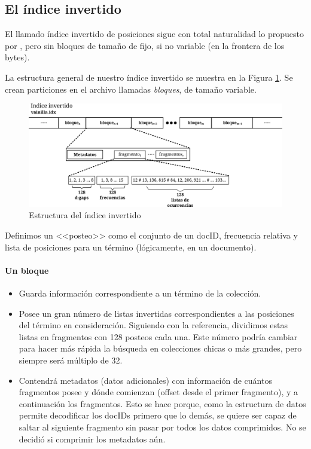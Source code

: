 \subsection{El índice invertido}

El llamado índice invertido de posiciones sigue con total naturalidad lo propuesto por \cite{Zhang:2008}, pero sin bloques de tamaño de fijo, si no variable (en la frontera de los bytes).

La estructura general de nuestro índice invertido se muestra en la Figura \ref{fig:indice}. Se crean particiones en el archivo llamadas \textit{bloques}, de tamaño variable. 

\begin{figure}[h]
\centering
    \includegraphics[scale=0.9]{./Images/estructura_1.png}
\caption{Estructura del índice invertido}
\label{fig:indice}
\end{figure}


Definimos un <<posteo>> como el conjunto de un docID, frecuencia relativa y lista de posiciones para un término (lógicamente, en un documento).

\paragraph{Un bloque}

\begin{itemize}
\item Guarda información correspondiente a un término de la colección.

\item Posee un gran número de listas invertidas correspondientes a las posiciones del término en consideración. Siguiendo con la referencia, dividimos estas listas en fragmentos con 128 posteos cada una. Este número podría cambiar para hacer más rápida la búsqueda en colecciones chicas o más grandes, pero siempre será múltiplo de 32.

\item Contendrá metadatos (datos adicionales) con información de cuántos fragmentos posee y dónde comienzan (offset desde el primer fragmento), y a continuación los fragmentos. Esto se hace porque, como la estructura de datos permite decodificar los docIDs primero que lo demás, se quiere ser capaz de saltar al siguiente fragmento sin pasar por todos los datos comprimidos. No se decidió si comprimir los metadatos aún.

\end{itemize}


